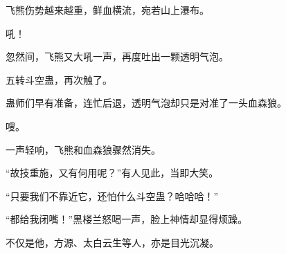 \begin{this_body}
飞熊伤势越来越重，鲜血横流，宛若山上瀑布。

吼！

忽然间，飞熊又大吼一声，再度吐出一颗透明气泡。

五转斗空蛊，再次触了。

蛊师们早有准备，连忙后退，透明气泡却只是对准了一头血森狼。

嗖。

一声轻响，飞熊和血森狼骤然消失。

“故技重施，又有何用呢？”有人见此，当即大笑。

“只要我们不靠近它，还怕什么斗空蛊？哈哈哈！”

“都给我闭嘴！”黑楼兰怒喝一声，脸上神情却显得烦躁。

不仅是他，方源、太白云生等人，亦是目光沉凝。

\end{this_body}

